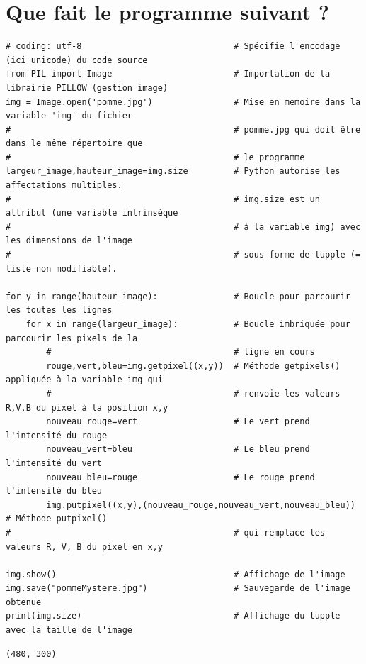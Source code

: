 \documentclass[11pt]{article}
\begin{document}
\section{Que fait le programme suivant ?}
\label{sec:orga6bbb42}

\begin{verbatim}
# coding: utf-8                              # Spécifie l'encodage (ici unicode) du code source
from PIL import Image                        # Importation de la librairie PILLOW (gestion image)
img = Image.open('pomme.jpg')                # Mise en memoire dans la variable 'img' du fichier 
#                                            # pomme.jpg qui doit être dans le même répertoire que
#                                            # le programme
largeur_image,hauteur_image=img.size         # Python autorise les affectations multiples.
#                                            # img.size est un attribut (une variable intrinsèque
#                                            # à la variable img) avec les dimensions de l'image
#                                            # sous forme de tupple (= liste non modifiable). 

for y in range(hauteur_image):               # Boucle pour parcourir les toutes les lignes
    for x in range(largeur_image):           # Boucle imbriquée pour parcourir les pixels de la
        #                                    # ligne en cours
        rouge,vert,bleu=img.getpixel((x,y))  # Méthode getpixels() appliquée à la variable img qui
        #                                    # renvoie les valeurs R,V,B du pixel à la position x,y
        nouveau_rouge=vert                   # Le vert prend l'intensité du rouge
        nouveau_vert=bleu                    # Le bleu prend l'intensité du vert
        nouveau_bleu=rouge                   # Le rouge prend l'intensité du bleu
        img.putpixel((x,y),(nouveau_rouge,nouveau_vert,nouveau_bleu)) # Méthode putpixel()
#                                            # qui remplace les valeurs R, V, B du pixel en x,y 

img.show()                                   # Affichage de l'image
img.save("pommeMystere.jpg")                 # Sauvegarde de l'image obtenue
print(img.size)                              # Affichage du tupple avec la taille de l'image 
\end{verbatim}

\begin{verbatim}
(480, 300)
\end{verbatim}
\end{document}

